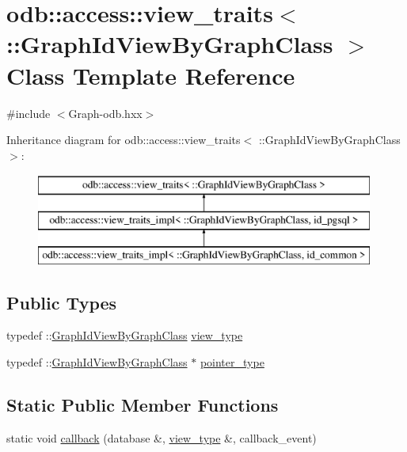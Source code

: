 \hypertarget{classodb_1_1access_1_1view__traits_3_01_1_1_graph_id_view_by_graph_class_01_4}{}\section{odb\+:\+:access\+:\+:view\+\_\+traits$<$ \+:\+:Graph\+Id\+View\+By\+Graph\+Class $>$ Class Template Reference}
\label{classodb_1_1access_1_1view__traits_3_01_1_1_graph_id_view_by_graph_class_01_4}


{\ttfamily \#include $<$Graph-\/odb.\+hxx$>$}

Inheritance diagram for odb\+:\+:access\+:\+:view\+\_\+traits$<$ \+:\+:Graph\+Id\+View\+By\+Graph\+Class $>$\+:\begin{figure}[H]
\begin{center}
\leavevmode
\includegraphics[height=3.000000cm]{d9/d74/classodb_1_1access_1_1view__traits_3_01_1_1_graph_id_view_by_graph_class_01_4}
\end{center}
\end{figure}
\subsection*{Public Types}
\begin{DoxyCompactItemize}
\item 
typedef \+::\hyperlink{struct_graph_id_view_by_graph_class}{Graph\+Id\+View\+By\+Graph\+Class} \hyperlink{classodb_1_1access_1_1view__traits_3_01_1_1_graph_id_view_by_graph_class_01_4_a49f6efdde0dc01877a82f1d411bbc336}{view\+\_\+type}
\item 
typedef \+::\hyperlink{struct_graph_id_view_by_graph_class}{Graph\+Id\+View\+By\+Graph\+Class} $\ast$ \hyperlink{classodb_1_1access_1_1view__traits_3_01_1_1_graph_id_view_by_graph_class_01_4_adbb3986775a15090b2b0b582295c0d22}{pointer\+\_\+type}
\end{DoxyCompactItemize}
\subsection*{Static Public Member Functions}
\begin{DoxyCompactItemize}
\item 
static void \hyperlink{classodb_1_1access_1_1view__traits_3_01_1_1_graph_id_view_by_graph_class_01_4_a62dbdb3b7ab3a7345ff82a08620efe4e}{callback} (database \&, \hyperlink{classodb_1_1access_1_1view__traits_3_01_1_1_graph_id_view_by_graph_class_01_4_a49f6efdde0dc01877a82f1d411bbc336}{view\+\_\+type} \&, callback\+\_\+event)
\end{DoxyCompactItemize}


